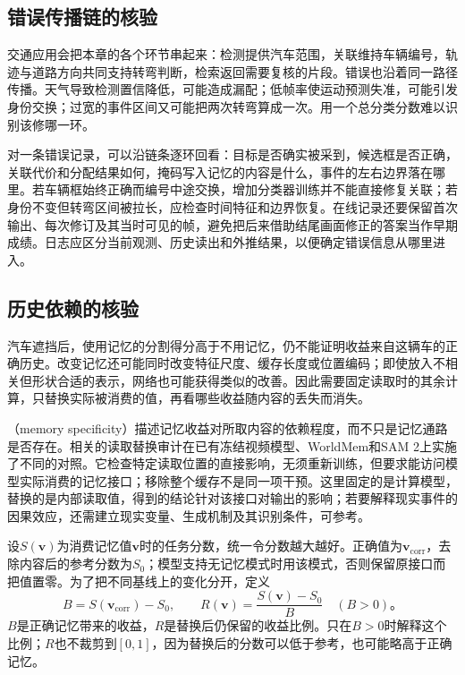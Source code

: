 \subsection{错误传播链的核验}
\label{sec:vision-video-error-trace}

交通应用会把本章的各个环节串起来：检测提供汽车范围，关联维持车辆编号，轨迹与道路方向共同支持转弯判断，检索返回需要复核的片段。错误也沿着同一路径传播。天气导致检测置信降低，可能造成漏配；低帧率使运动预测失准，可能引发身份交换；过宽的事件区间又可能把两次转弯算成一次。用一个总分类分数难以识别该修哪一环。

对一条错误记录，可以沿链条逐环回看：目标是否确实被采到，候选框是否正确，关联代价和分配结果如何，掩码写入记忆的内容是什么，事件的左右边界落在哪里。若车辆框始终正确而编号中途交换，增加分类器训练并不能直接修复关联；若身份不变但转弯区间被拉长，应检查时间特征和边界恢复。在线记录还要保留首次输出、每次修订及其当时可见的帧，避免把后来借助结尾画面修正的答案当作早期成绩。日志应区分当前观测、历史读出和外推结果，以便确定错误信息从哪里进入。

\subsection{历史依赖的核验}
\label{sec:vision-video-memory-specificity}

汽车遮挡后，使用记忆的分割得分高于不用记忆，仍不能证明收益来自这辆车的正确历史。改变记忆还可能同时改变特征尺度、缓存长度或位置编码；即使放入不相关但形状合适的表示，网络也可能获得类似的改善。因此需要固定读取时的其余计算，只替换实际被消费的值，再看哪些收益随内容的丢失而消失。

（memory specificity）描述记忆收益对所取内容的依赖程度，而不只是记忆通路是否存在。相关的读取替换审计在已有冻结视频模型、WorldMem和SAM 2上实施了不同的对照。它检查特定读取位置的直接影响，无须重新训练，但要求能访问模型实际消费的记忆接口；移除整个缓存不是同一项干预。这里固定的是计算模型，替换的是内部读取值，得到的结论针对该接口对输出的影响；若要解释现实事件的因果效应，还需建立现实变量、生成机制及其识别条件，可参考。

设$S(\bm{v})$为消费记忆值$\bm{v}$时的任务分数，统一令分数越大越好。正确值为$\bm{v}_{\mathrm{corr}}$，去除内容后的参考分数为$S_0$；模型支持无记忆模式时用该模式，否则保留原接口而把值置零。为了把不同基线上的变化分开，定义
\begin{equation}
  B=S(\bm{v}_{\mathrm{corr}})-S_0,\qquad
  R(\bm{v})=\frac{S(\bm{v})-S_0}{B}\quad(B>0)\text{。}
  \label{eq:vision-video-memory-recovery}
\end{equation}
$B$是正确记忆带来的收益，$R$是替换后仍保留的收益比例。只在$B>0$时解释这个比例；$R$也不裁剪到$[0,1]$，因为替换后的分数可以低于参考，也可能略高于正确记忆。


